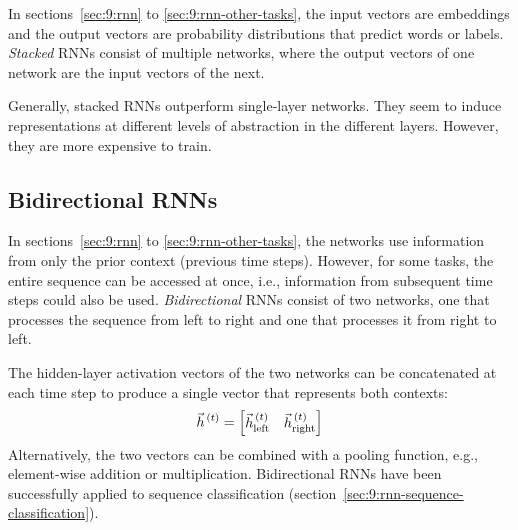 In sections~\ref{sec:9:rnn} to \ref{sec:9:rnn-other-tasks}, the input vectors
are embeddings and the output vectors are probability distributions that predict
words or labels.
\textit{Stacked} RNNs consist of multiple networks, where the output vectors of
one network are the input vectors of the next.

Generally, stacked RNNs outperform single-layer networks.
They seem to induce representations at different levels of abstraction in the
different layers.
However, they are more expensive to train.

\subsection{Bidirectional RNNs}

In sections~\ref{sec:9:rnn} to \ref{sec:9:rnn-other-tasks}, the networks use
information from only the prior context (previous time steps).
However, for some tasks, the entire sequence can be accessed at once, i.e.,
information from subsequent time steps could also be used.
\textit{Bidirectional} RNNs consist of two networks, one that processes the
sequence from left to right and one that processes it from right to left.

The hidden-layer activation vectors of the two networks can be concatenated at
each time step to produce a single vector that represents both contexts:
\begin{equation}
  \vec{h}^{\,(t)} = \begin{bmatrix}
    \vec{h}^{\,(t)}_\text{left} & \vec{h}^{\,(t)}_\text{right}
  \end{bmatrix}
\end{equation}
Alternatively, the two vectors can be combined with a pooling function, e.g.,
element-wise addition or multiplication.
Bidirectional RNNs have been successfully applied to sequence classification
(section~\ref{sec:9:rnn-sequence-classification}).